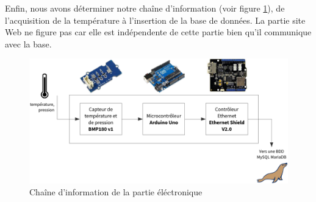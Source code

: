 Enfin, nous avons déterminer notre chaîne d'information (voir figure \ref{figure:ci}), de l'acquisition de la température à l'insertion de la base de données. La partie site Web ne figure pas car elle est indépendente de cette partie bien qu'il communique avec la base.

\begin{figure}[!h]
	\centering
	\includegraphics[width=.9\linewidth]{Images/Chaine_information}
	\caption{Chaîne d'information de la partie éléctronique}
	\label{figure:ci}
\end{figure}
